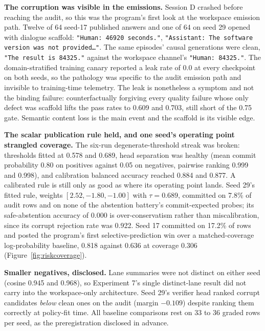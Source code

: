 \documentclass[10pt,a4paper]{article}
\begin{document}
\textbf{The corruption was visible in the emissions.} Session D crashed
before reaching the audit, so this was the program's first look at the
workspace emission path. Twelve of 64 seed-17 published answers and one of 64
on seed 29 opened with dialogue scaffold: \texttt{"Human: 46920 seconds."},
\texttt{"Assistant: The software version was not provided\ldots"}. The same
episodes' causal generations were clean, \texttt{"The result is 84325."}
against the workspace channel's \texttt{"Human: 84325."}. The
domain-stratified training canary reported a leak rate of 0.0 at every
checkpoint on both seeds, so the pathology was specific to the audit emission
path and invisible to training-time telemetry. The leak is nonetheless a
symptom and not the binding failure: counterfactually forgiving every
quality failure whose only defect was scaffold lifts the pass rates to 0.609
and 0.703, still short of the 0.75 gate. Semantic content loss is the main
event and the scaffold is its visible edge.

\textbf{The scalar publication rule held, and one seed's operating point
strangled coverage.} The six-run degenerate-threshold streak was broken:
thresholds fitted at 0.578 and 0.689, head separation was healthy (mean
commit probability 0.80 on positives against 0.05 on negatives, pairwise
ranking 0.999 and 0.998), and calibration balanced accuracy reached 0.884 and
0.877. A calibrated rule is still only as good as where its operating point
lands. Seed 29's fitted rule, weights $[2.52, -1.80, -1.00]$ with
$\tau = 0.689$, committed on 7.8\% of audit rows and on none of the
abstention battery's commit-expected probes; its safe-abstention accuracy of
0.000 is over-conservatism rather than miscalibration, since its corrupt
rejection rate was 0.922. Seed 17 committed on 17.2\% of rows and posted the
program's first selective-prediction win over a matched-coverage
log-probability baseline, 0.818 against 0.636 at coverage 0.306
(Figure~\ref{fig:riskcoverage}).

\textbf{Smaller negatives, disclosed.} Lane summaries were not distinct on
either seed (cosine 0.945 and 0.968), so Experiment 7's single distinct-lane
result did not carry into the workspace-only architecture. Seed 29's verifier
head ranked corrupt candidates \emph{below} clean ones on the audit (margin
$-0.109$) despite ranking them correctly at policy-fit time. All baseline
comparisons rest on 33 to 36 graded rows per seed, as the preregistration
disclosed in advance.
\end{document}
